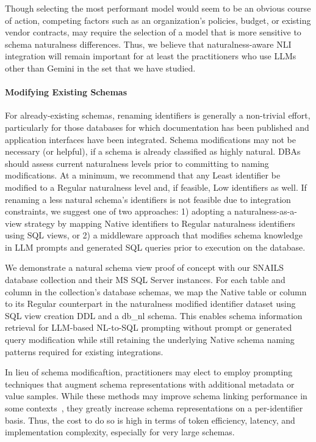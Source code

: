 Though selecting the most performant model would seem to be an obvious course of action, competing factors such as an organization's policies, budget, or existing vendor contracts, may require the selection of a model that is more sensitive to schema naturalness differences. 
Thus, we believe that naturalness-aware NLI integration will remain important for at least the practitioners who use LLMs other than Gemini in the set that we have studied.


\paragraph{\textbf{Modifying Existing Schemas}}
For already-existing schemas, renaming identifiers is generally a non-trivial effort, particularly for those databases for which documentation has been published and application interfaces have been integrated.
Schema modifications may not be necessary (or helpful), if a schema is already classified as highly natural.
DBAs should assess current naturalness levels prior to committing to naming modifications.
At a minimum, we recommend that any Least identifier be modified to a Regular naturalness level and, if feasible, Low identifiers as well.
If renaming a less natural schema's identifiers is not feasible due to integration constraints, we suggest one of two approaches: 1) adopting a naturalness-as-a-view strategy by mapping Native identifiers to Regular naturalness identifiers using SQL views, or 2) a middleware approach that modifies schema knowledge in LLM prompts and generated SQL queries prior to execution on the database.


We demonstrate a natural schema view proof of concept with our SNAILS database collection and their MS SQL Server instances.
For each table and column in the collection's database schemas, we map the Native table or column to its Regular counterpart in the naturalness modified identifier dataset using SQL view creation DDL and a db\_nl schema.
This enables schema information retrieval for LLM-based NL-to-SQL prompting without prompt or generated query modification while still retaining the underlying Native schema naming patterns required for existing integrations.

In lieu of schema modificaftion, practitioners may elect to employ prompting techniques that augment schema representations with additional metadata or value samples.
While these methods may improve schema linking performance in some contexts~\cite{nan2023enhancingfewshottexttosqlcapabilities}, they greatly increase schema representations on a per-identifier basis.
Thus, the cost to do so is high in terms of token efficiency, latency, and implementation complexity, especially for very large schemas.

